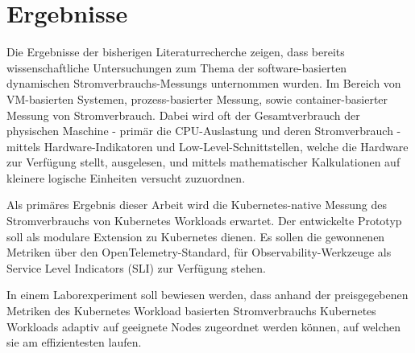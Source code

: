 \chapter{Ergebnisse}

Die Ergebnisse der bisherigen Literaturrecherche zeigen,
dass bereits wissenschaftliche Untersuchungen zum Thema
der software-basierten dynamischen Stromverbrauchs-Messungs
unternommen wurden. 
Im Bereich von VM-basierten Systemen, prozess-basierter Messung, sowie container-basierter Messung
von Stromverbrauch. Dabei wird oft der Gesamtverbrauch der physischen Maschine - primär die 
CPU-Auslastung und deren Stromverbrauch -
mittels Hardware-Indikatoren und Low-Level-Schnittstellen, welche die Hardware zur Verfügung stellt, ausgelesen,
und mittels mathematischer Kalkulationen auf kleinere logische Einheiten versucht zuzuordnen.
\bigskip

Als primäres Ergebnis dieser Arbeit wird die Kubernetes-native Messung des Stromverbrauchs von Kubernetes Workloads
erwartet. Der entwickelte Prototyp soll als modulare Extension zu Kubernetes dienen.
Es sollen die gewonnenen Metriken über den OpenTelemetry-Standard,
für Observability-Werkzeuge als Service Level Indicators (SLI) zur Verfügung stehen.
\bigskip

In einem Laborexperiment soll bewiesen werden, dass
anhand der preisgegebenen Metriken des Kubernetes Workload basierten Stromverbrauchs
Kubernetes Workloads adaptiv auf geeignete Nodes zugeordnet werden können,
auf welchen sie am effizientesten laufen.
